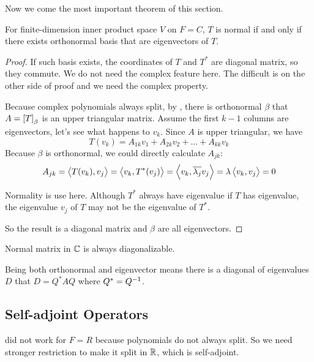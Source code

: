 Now we come the most important theorem of this section.

\begin{theorem}\label{normal_orthonormal_with_complex_space}
    For finite-dimension inner product space $V$ on $F=C$, $T$ is normal if and only if there exists orthonormal basis that are eigenvectors of $T$.
\end{theorem}
\begin{proof}
    If such basis exists, the coordinates of $T$ and $T^*$ are diagonal matrix, so they commute. We do not need the complex feature here. The difficult is on the other side of proof and we need the complex property.
    
    Because complex polynomials always split, by , there is orthonormal $\beta$ that $A=\coordinate{T}_\beta$ is an upper triangular matrix. Assume the first $k-1$ columns are eigenvectors, let's see what happens to $v_{k}$. Since $A$ is upper triangular, we have
    \begin{equation*}
        T(v_k) = A_{1k} v_1 + A_{2k} v_2 + ... + A_{kk} v_k
    \end{equation*}
    Because $\beta$ is orthonormal, we could directly calculate $A_{jk}$:
    \begin{equation*}
        A_{jk} = \left\langle \displaystyle T(v_k), v_j \right\rangle = \left\langle \displaystyle v_k, T^*(v_j) \right\rangle = \left\langle \displaystyle v_k, \overline{\lambda_j} v_j \right\rangle = \lambda \left\langle \displaystyle v_k, v_j \right\rangle = 0
    \end{equation*}
    
    Normality is use here. Although $T^*$ always have eigenvalue if $T$ has eigenvalue, the eigenvalue $v_j$ of $T$ may not be the eigenvalue of $T^*$.
    
    So the result is a diagonal matrix and $\beta$ are all eigenvectors.
\end{proof}

\begin{theorem}
    Normal matrix in $\mathbb{C}$ is always diagonalizable.
\end{theorem}


Being both orthonormal and eigenvector means there is a diagonal of eigenvalues $D$ that $D = Q^* A Q$ where $Q^* = {Q}^{-1}$.


\subsection{Self-adjoint Operators}

 did not work for $F=R$ because polynomials do not always split. So we need stronger restriction to make it split in $\mathbb{R}$, which is self-adjoint.

